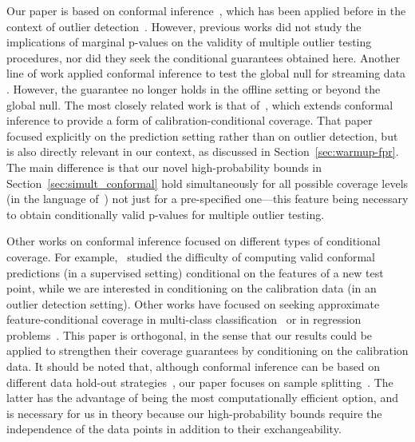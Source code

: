 Our paper is based on conformal inference~\cite{vovk1999machine, vovk2005algorithmic}, which has been applied before in the context of outlier detection~\cite{laxhammar2015inductive,smith2015conformal,ishimtsev2017conformal,guan2019prediction,cai2020real,haroush2021statistical}.
However, previous works did not study the implications of marginal p-values on the validity of multiple outlier testing procedures, nor did they seek the conditional guarantees obtained here. Another line of work applied conformal inference to test the global null for streaming data \citep{vovk2003, fedorova2012plug, vovk2019testing, vovk2020testing, vovk2021retrain}. However, the guarantee no longer holds in the offline setting or beyond the global null.
The most closely related work is that of~\cite{vovk2012conditional}, which extends conformal inference to provide a form of calibration-conditional coverage. That paper focused explicitly on the prediction setting  rather than on outlier detection, but is also directly relevant in our context, as discussed in Section~\ref{sec:warmup-fpr}.
The main difference is that our novel high-probability bounds in Section~\ref{sec:simult_conformal} hold simultaneously for all possible coverage levels (in the language of~\cite{vovk2012conditional}) not just for a pre-specified one---this feature being necessary to obtain conditionally valid p-values for multiple outlier testing.

Other works on conformal inference focused on different types of conditional coverage.
For example,~\cite{barber2019limits} studied the difficulty of computing valid conformal predictions (in a supervised setting) conditional on the features of a new test point, while we are interested in conditioning on the calibration data (in an outlier detection setting).
Other works have focused on seeking approximate feature-conditional coverage in multi-class classification~\cite{hechtlinger2018cautious, romano2020classification, cauchois2020knowing,angelopoulos2020sets} or in regression problems~\cite{romano2019conformalized, izbicki2019flexible, chernozhukov2019distributional, kivaranovic2019adaptive, gupta2020nested}.
This paper is orthogonal, in the sense that our results could be applied to strengthen their coverage guarantees by conditioning on the calibration data.
It should be noted that, although conformal inference can be based on different data hold-out strategies~\cite{vovk2015cross, barber2019predictive, kim2020predictive}, our paper focuses on {sample} splitting~\cite{papadopoulos2002inductive, lei2013conformal}.
The latter has the advantage of being the most computationally efficient option, and is necessary for us in theory because our high-probability bounds require the independence of the data points in addition to their exchangeability.

